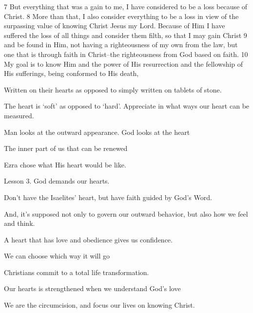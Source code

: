 \begin{bible}
7 But everything that was a gain to me, I have considered to be a loss because of Christ. 8 More than that, I also consider everything to be a loss in view of the surpassing value of knowing Christ Jesus my Lord. Because of Him I have suffered the loss of all things and consider them filth, so that I may gain Christ 9 and be found in Him, not having a righteousness of my own from the law, but one that is through faith in Christ--the righteousness from God based on faith. 10 My goal is to know Him and the power of His resurrection and the fellowship of His sufferings, being conformed to His death,

\end{bible}

\begin{discussion}

Written on their hearts as opposed to simply written on tablets of stone.

The heart is `soft' as opposed to `hard'.  Appreciate in what ways our heart can be measured.


 Man looks at the outward appearance.  God looks at the heart

 The inner part of us that can be renewed

 Ezra chose what His heart would be like.

 Lesson 3.  God demands our hearts.


 Don't have the Isaelites' heart, but have faith guided by God's Word.

And, it's supposed not only to govern our outward behavior, but also how we feel and think.

 A heart that has love and obedience gives us confidence.\\


 We can choose which way it will go

 Christians commit to a total life transformation.

 Our hearts is strengthened when we understand God's love

 We are the circumcision, and focus our lives on knowing Christ.

\end{discussion}


